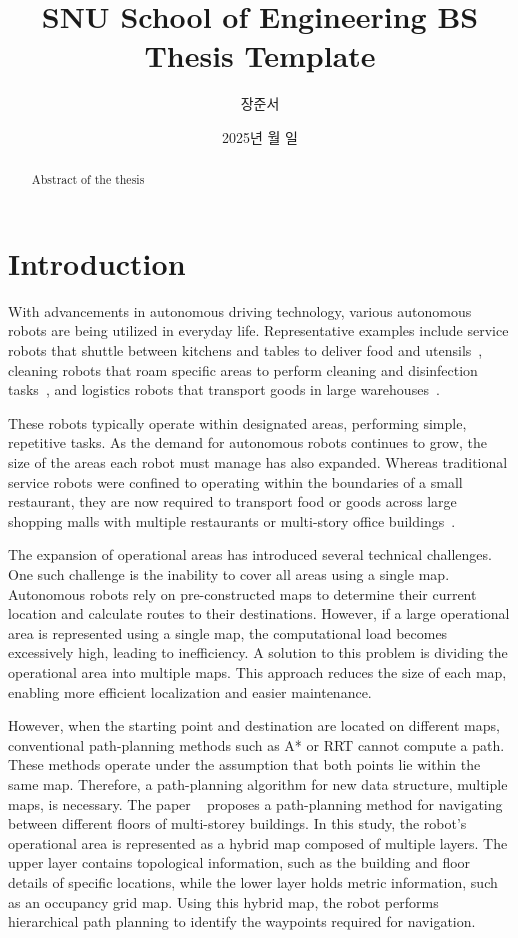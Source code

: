 \documentclass[en]{snu-cse-bsc-thesis}
\title{SNU School of Engineering BS Thesis Template}
\author{장준서}
\date{2025년 월 일}
\begin{document}
\maketitle

\begin{abstract}
  Abstract of the thesis
\end{abstract}

\tableofcontents
\listoftables
\listoffigures

\chapter{Introduction}\label{chap:introduction}
With advancements in autonomous driving technology, various autonomous robots are being utilized in everyday life. Representative examples include service robots that shuttle between kitchens and tables to deliver food and utensils~\cite{ServiPlus}, cleaning robots that roam specific areas to perform cleaning and disinfection tasks~\cite{ServiAir}, and logistics robots that transport goods in large warehouses~\cite{Carti100}.

These robots typically operate within designated areas, performing simple, repetitive tasks. As the demand for autonomous robots continues to grow, the size of the areas each robot must manage has also expanded. Whereas traditional service robots were confined to operating within the boundaries of a small restaurant, they are now required to transport food or goods across large shopping malls with multiple restaurants or multi-story office buildings~\cite{ServiLift}.

The expansion of operational areas has introduced several technical challenges. One such challenge is the inability to cover all areas using a single map. Autonomous robots rely on pre-constructed maps to determine their current location and calculate routes to their destinations. However, if a large operational area is represented using a single map, the computational load becomes excessively high, leading to inefficiency. A solution to this problem is dividing the operational area into multiple maps. This approach reduces the size of each map, enabling more efficient localization and easier maintenance. 

However, when the starting point and destination are located on different maps, conventional path-planning methods such as A* or RRT cannot compute a path. These methods operate under the assumption that both points lie within the same map. Therefore, a path-planning algorithm for new data structure, multiple maps, is necessary. The paper ~\cite{MultiStoreyBuildingNavigation} proposes a path-planning method for navigating between different floors of multi-storey buildings. In this study, the robot's operational area is represented as a hybrid map composed of multiple layers. The upper layer contains topological information, such as the building and floor details of specific locations, while the lower layer holds metric information, such as an occupancy grid map. Using this hybrid map, the robot performs hierarchical path planning to identify the waypoints required for navigation.
\end{document}
